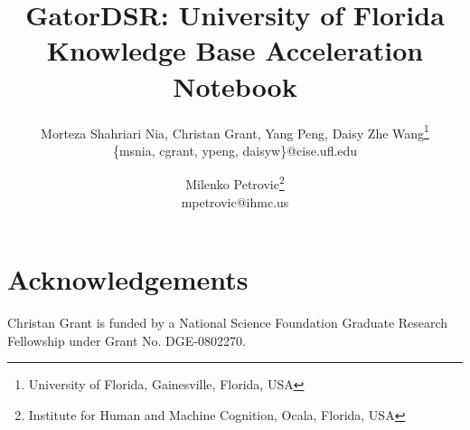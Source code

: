 \documentclass[10pt]{article}
\begin{document}
\title{GatorDSR: University of Florida Knowledge Base Acceleration Notebook}





\author{Morteza Shahriari Nia, Christan Grant, Yang Peng, Daisy Zhe Wang\footnote{University of Florida, Gainesville, Florida, USA}\\
       {\{msnia, cgrant, ypeng, daisyw\}@cise.ufl.edu}
\and
  Milenko Petrovic\footnote{Institute for Human and Machine Cognition, Ocala, Florida, USA}\\
       {mpetrovic@ihmc.us}
}

\maketitle
















\section*{Acknowledgements}
Christan Grant is funded by a National Science Foundation Graduate Research
Fellowship under Grant No. DGE-0802270. 

%
%



\end{document}
